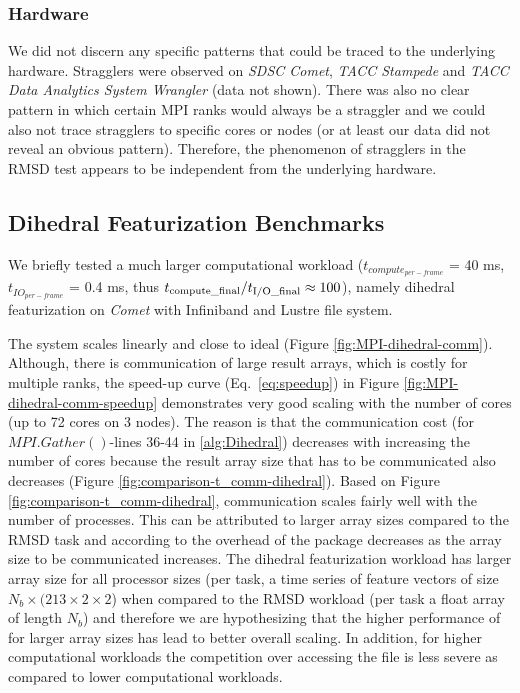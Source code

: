 \subsubsection*{Hardware}

We did not discern any specific patterns that could be traced to the underlying hardware. Stragglers were observed on \emph{SDSC Comet},
\emph{TACC Stampede} and \emph{TACC Data Analytics System Wrangler} (data not shown). There was also no clear pattern in which certain MPI
ranks would always be a straggler and we could also not trace stragglers to specific cores or nodes (or at least our data did not
reveal an obvious pattern). Therefore, the phenomenon of stragglers in the RMSD test appears to be independent from the underlying hardware.

\subsection{Dihedral Featurization Benchmarks}
\label{DF}
We briefly tested a much larger computational workload ($t_{compute_{per-frame}}$ = 40 ms, $t_{IO_{per-frame}}$ = 0.4 ms, thus ${t}_{\text{compute\_final}}/{t}_{\text{I/O\_final}} \approx 100$), namely dihedral
featurization on \emph{Comet} with Infiniband and Lustre file system.

The system scales linearly and close to ideal (Figure \ref{fig:MPI-dihedral-comm}). Although, there is communication of large
result arrays, which is costly for multiple ranks, the speed-up curve (Eq.~\ref{eq:speedup}) in Figure \ref{fig:MPI-dihedral-comm-speedup}
demonstrates very good scaling with the number of cores (up to 72 cores on 3 nodes).  The reason is that the communication cost (for
$MPI.Gather()$-lines 36-44 in \ref{alg:Dihedral}) decreases with increasing the number of cores because the result array size that has to be
communicated also decreases (Figure \ref{fig:comparison-t_comm-dihedral}).  Based on Figure \ref{fig:comparison-t_comm-dihedral}, communication scales fairly well
with the number of processes. This can be attributed to larger array sizes compared to the RMSD task and according to \citet{Dalcin:2011aa}
the overhead of the  package decreases as the array size to be communicated increases. The dihedral featurization workload
has larger array size for all processor sizes (per task, a time series of feature vectors of size $N_{b} \times (213 \times 2 \times 2$) when
compared to the RMSD workload (per task a float array of length $N_{b}$) and therefore we are hypothesizing that the higher
performance of  for larger array sizes has lead to better overall scaling. 
In addition, for higher computational workloads the competition over accessing the file is less severe as compared to lower computational workloads. 
 
